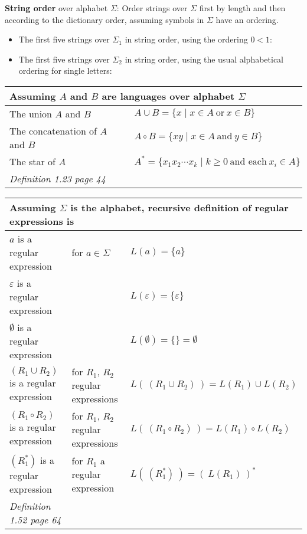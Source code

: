     
    {\bf String order} over alphabet $\Sigma$: Order strings over  $\Sigma$ first by length and then according to the dictionary order, assuming symbols in $\Sigma$  have an ordering.
    
    \begin{itemize}
    \setlength{\itemsep}{10pt}
    \item[] The first five strings over $\Sigma_1$ in string order, using the ordering $0 <  1$:
    
    \item[] The first five strings over $\Sigma_2$ in string order, using the usual alphabetical ordering for single letters:
    
    \end{itemize}
    
    \begin{center}
    \begin{tabular}{|ll|}
    \hline
    \multicolumn{2}{|l|}{Assuming $A$ and $B$  are languages  over alphabet $\Sigma$}\\
    \hline
    The union $A$ and $B$   & $A \cup B = \{  x \mid x \in A~\text{or}~x  \in  B \}$ \\
    The concatenation of $A$ and $B$   & $A \circ B = \{  xy \mid x \in A~\text{and}~y  \in  B \} $ \\
    The star of $A$ & $A^* = \{ x_1 x_2 \cdots  x_k \mid k  \geq 0 ~\text{and each}~x_i \in A \}$ \\
    \hline
    {\it Definition 1.23 page 44} & \\
    \hline
    \end{tabular}
    \end{center}
    
    
    
    \begin{center}
    \begin{tabular}{|lll|}
    \hline
    \multicolumn{3}{|l|}{Assuming $\Sigma$ is the alphabet, recursive definition of regular expressions is}\\
    \hline
    $a$ is a regular expression  & for $a \in \Sigma$ & $L(a) = \{a\}$ \\
    $\varepsilon$ is a regular expression   & & $L(\varepsilon) = \{ \varepsilon \}$ \\
    $\emptyset$ is a regular expression  & & $L(\emptyset) = \{\} =  \emptyset$ \\
    $(R_1 \cup R_2)$ is a regular expression & for  $R_1$, $R_2$ regular expressions & 
    $L( ~(R_1\cup R_2) ~)  =
    L(R_1) \cup L(R_2)$ \\
    $(R_1 \circ R_2)$ is a regular expression & for  $R_1$, $R_2$ regular expressions & 
    $L( ~(R_1\circ R_2) ~)  =
    L(R_1) \circ L(R_2)$ \\
    $(R_1^*)$ is a regular expression & for  $R_1$ a regular expression & $L( ~(R_1^*) ~)  = (~L(R_1) ~)^*$ \\
    \hline
    {\it Definition 1.52 page 64} & & \\
    \hline
    \end{tabular}
    \end{center}
    
